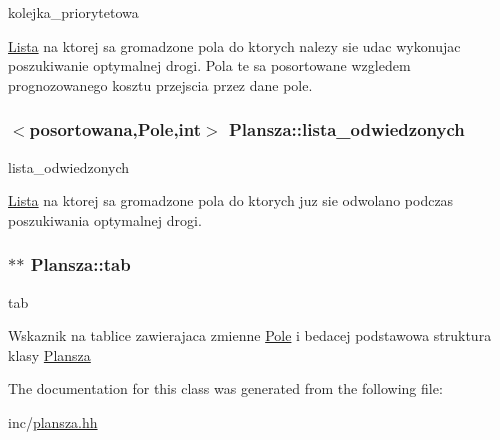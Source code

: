 kolejka\+\_\+priorytetowa 

\hyperlink{class_lista}{Lista} na ktorej sa gromadzone pola do ktorych nalezy sie udac wykonujac poszukiwanie optymalnej drogi. Pola te sa posortowane wzgledem prognozowanego kosztu przejscia przez dane pole. \hypertarget{class_plansza_a49598690b46b9ef9c80761f77ef3a7e4}{
\subsubsection[{lista\+\_\+odwiedzonych}]{$<$posortowana,{\bf Pole},int$>$ Plansza\+::lista\+\_\+odwiedzonych\hspace{0.3cm}{\ttfamily [private]}}}\label{class_plansza_a49598690b46b9ef9c80761f77ef3a7e4}


lista\+\_\+odwiedzonych 

\hyperlink{class_lista}{Lista} na ktorej sa gromadzone pola do ktorych juz sie odwolano podczas poszukiwania optymalnej drogi. \hypertarget{class_plansza_abe1ebd55bf2c57ab4294c93ade95fb58}{
\subsubsection[{tab}]{$\ast$$\ast$ Plansza\+::tab\hspace{0.3cm}{\ttfamily [private]}}}\label{class_plansza_abe1ebd55bf2c57ab4294c93ade95fb58}


tab 

Wskaznik na tablice zawierajaca zmienne \hyperlink{class_pole}{Pole} i bedacej podstawowa struktura klasy \hyperlink{class_plansza}{Plansza} 

The documentation for this class was generated from the following file\+:\begin{DoxyCompactItemize}
\item 
inc/\hyperlink{plansza_8hh}{plansza.\+hh}\end{DoxyCompactItemize}
